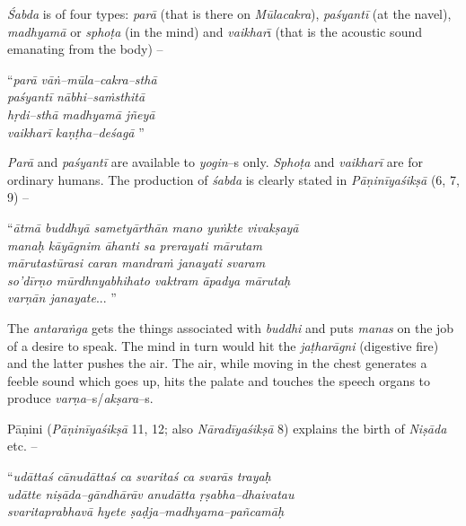 \textit{Śabda} is of four types: \textit{parā} (that is there on \textit{Mūlacakra}), \textit{paśyantī} (at the navel), \textit{madhyamā} or \textit{sphoṭa} (in the mind) and \textit{vaikhar}ī (that is the acoustic sound emanating from the body) –

\begin{myquote}
“\textit{parā vāṅ–mūla–cakra–sthā}\\\textit{paśyantī nābhi–saṁsthitā }\\\textit{hṛdi–sthā madhyamā jñeyā}\\\textit{vaikharī kaṇṭha–deśagā} ” 
\end{myquote}

\textit{Parā} and \textit{paśyantī} are available to \textit{yogin}–s only. \textit{Sphoṭa} and \textit{vaikharī} are for ordinary humans. The production of \textit{śabda} is clearly stated in \textit{Pāṇinīyaśikṣā} (6, 7, 9) –

\begin{myquote}
“\textit{ātmā buddhyā sametyārthān mano yuṅkte vivakṣayā }\\\textit{manaḥ kāyāgnim āhanti sa prerayati mārutam }\\\textit{mārutastūrasi caran mandraṁ janayati svaram }\\\textit{so’dīrṇo mūrdhnyabhihato vaktram āpadya mārutaḥ }\\\textit{varṇān janayate}... ”
\end{myquote}

The \textit{antaraṅga} gets the things associated with \textit{buddhi} and puts \textit{manas} on the job of a desire to speak. The mind in turn would hit the \textit{jaṭharāgni} (digestive fire) and the latter pushes the air. The air, while moving in the chest generates a feeble sound which goes up, hits the palate and touches the speech organs to produce \textit{varṇa}–s/\textit{akṣara}–s.

Pāṇini (\textit{Pāṇinīyaśikṣā} 11, 12; also \textit{Nāradīyaśikṣā} 8) explains the birth of \textit{Niṣāda} etc. –

\begin{myquote}
“\textit{udāttaś cānudāttaś ca svaritaś ca svarās trayaḥ }\\\textit{udātte niṣāda–gāndhārāv anudātta ṛṣabha–dhaivatau }\\\textit{svaritaprabhavā hyete ṣaḍja–madhyama–pañcamāḥ} 
\end{myquote}

